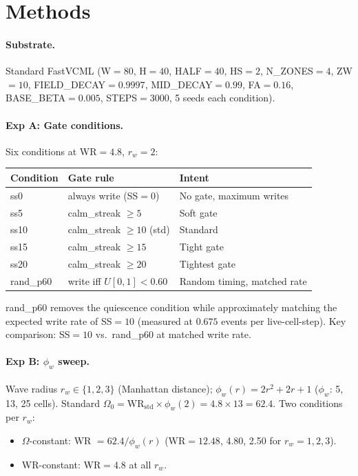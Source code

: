 \documentclass[11pt,a4paper]{article}
\begin{document}
\section{Methods}

\paragraph{Substrate.}
Standard FastVCML (W$=80$, H$=40$, HALF$=40$, HS$=2$, N\_ZONES$=4$, ZW$=10$,
FIELD\_DECAY$=0.9997$, MID\_DECAY$=0.99$, FA$=0.16$, BASE\_BETA$=0.005$,
STEPS$=3000$, 5 seeds each condition).

\paragraph{Exp A: Gate conditions.}
Six conditions at WR$=4.8$, $r_w=2$:
\begin{center}
\begin{tabular}{lll}
\toprule
\textbf{Condition} & \textbf{Gate rule} & \textbf{Intent} \\
\midrule
ss0      & always write (SS$=0$)            & No gate, maximum writes \\
ss5      & calm\_streak $\geq 5$            & Soft gate \\
ss10     & calm\_streak $\geq 10$ (std)     & Standard \\
ss15     & calm\_streak $\geq 15$           & Tight gate \\
ss20     & calm\_streak $\geq 20$           & Tightest gate \\
rand\_p60& write iff $U[0,1] < 0.60$       & Random timing, matched rate \\
\bottomrule
\end{tabular}
\end{center}

\noindent
rand\_p60 removes the quiescence condition while approximately matching the
expected write rate of SS$=10$ (measured at $0.675$ events per live-cell-step).
Key comparison: SS$=10$ vs.\ rand\_p60 at matched write rate.

\paragraph{Exp B: $\phi_w$ sweep.}
Wave radius $r_w \in \{1,2,3\}$ (Manhattan distance); $\phi_w(r) = 2r^2+2r+1$
($\phi_w$: 5, 13, 25 cells).
Standard $\Omega_0 = \mathrm{WR}_\mathrm{std}\times\phi_w(2) = 4.8\times13=62.4$.
Two conditions per $r_w$:
\begin{itemize}
\item $\Omega$-constant: WR $= 62.4/\phi_w(r)$
  (WR$=12.48$, 4.80, 2.50 for $r_w=1,2,3$).
\item WR-constant: WR$=4.8$ at all $r_w$.
\end{itemize}
\end{document}
